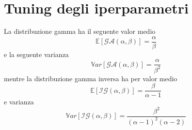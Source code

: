 \chapter{Tuning degli iperparametri}
La distribuzione gamma ha il seguente valor medio
\begin{equation}
\mathbb{E}[\mathcal{G}\mathcal{A}(\alpha,\beta)]=\frac{\alpha}{\beta}
\end{equation}
e la seguente varianza
\begin{equation}
\mathbb{V}ar[\mathcal{G}\mathcal{A}(\alpha,\beta)]=\frac{\alpha}{\beta^2}
\end{equation}
mentre la distribuzione gamma inversa ha per valor medio
\begin{equation}
\mathbb{E}[\mathcal{I}\mathcal{G}(\alpha,\beta)]=\frac{\beta}{\alpha-1}
\end{equation}
e varianza
\begin{equation}
\mathbb{V}ar[\mathcal{I}\mathcal{G}(\alpha,\beta)]=\frac{\beta^2}{(\alpha-1)^2(\alpha-2)}
\end{equation}